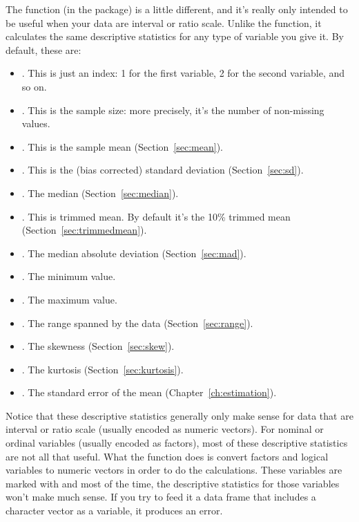 The  function (in the  package) is a little different, and it's really only intended to be useful when your data are interval or ratio scale. Unlike the  function, it calculates the same descriptive statistics for any type of variable you give it. By default, these are:
\begin{itemize}\itemsep -3pt
\item {}. This is just an index: 1 for the first variable, 2 for the second variable, and so on.
\item {}. This is the sample size: more precisely, it's the number of non-missing values.
\item {}. This is the sample mean (Section~\ref{sec:mean}).
\item {}. This is the (bias corrected) standard deviation (Section~\ref{sec:sd}).
\item {}. The median (Section~\ref{sec:median}).
\item {}. This is trimmed mean. By default it's the 10\% trimmed mean (Section~\ref{sec:trimmedmean}).
\item {}. The median absolute deviation (Section~\ref{sec:mad}).
\item {}. The minimum value.
\item {}. The maximum value. 
\item {}. The range spanned by the data (Section~\ref{sec:range}).
\item {}. The skewness (Section~\ref{sec:skew}).
\item {}. The kurtosis (Section~\ref{sec:kurtosis}).
\item {}. The standard error of the mean (Chapter~\ref{ch:estimation}).
\end{itemize}
Notice that these descriptive statistics generally only make sense for data that are interval or ratio scale (usually encoded as numeric vectors). For nominal or ordinal variables (usually encoded as factors), most of these descriptive statistics are not all that useful. What the  function does is convert factors and logical variables to numeric vectors in order to do the calculations. These variables are marked with \rtext{*} and most of the time, the descriptive statistics for those variables won't make much sense. If you try to feed it a data frame that includes a character vector as a variable, it produces an error.

